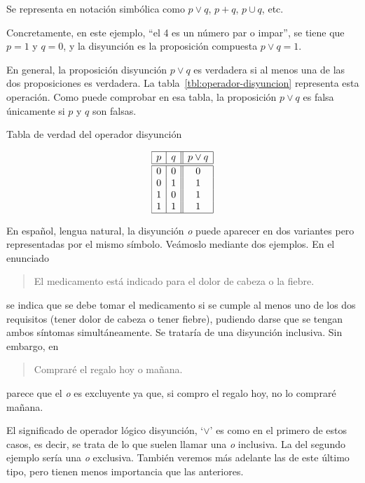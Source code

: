 \noindent Se representa en notación simbólica como $p \lor q$, $p + q$, $p
\cup q$, etc.

Concretamente, en este ejemplo, ``el 4 es un número par o impar'', se tiene
que $p = 1$ y $q = 0$, y la disyunción es la proposición compuesta $p \lor q
= 1$.

En general, la proposición disyunción $p \lor q$ es verdadera si al menos
una de las dos proposiciones es verdadera. La
tabla~\ref{tbl:operador-disyuncion} representa esta operación. Como puede
comprobar en esa tabla, la proposición $p \lor q$ es falsa únicamente si $p$
y $q$ son falsas.

\begin{table}[h]%
  \caption{Tabla de verdad del operador disyunción}
  \label{tbl:operador-disyuncion}%
  \centering
  $$
    \begin{array}{|c|c||c|}
      \hline
      p & q & p \lor q \\
      \hline
      \hline
      0 & 0 & 0 \\
      0 & 1 & 1 \\
      1 & 0 & 1 \\
      1 & 1 & 1 \\
      \hline
    \end{array}
  $$
\end{table}

En español, lengua natural, la disyunción \emph{o} puede aparecer en dos
variantes pero representadas por el mismo símbolo. Veámoslo mediante dos
ejemplos. En el enunciado

\begin{quote}
  El medicamento está indicado para el dolor de cabeza o la fiebre.
\end{quote}

\noindent se indica que se debe tomar el medicamento si se cumple al menos
uno de los dos requisitos (tener dolor de cabeza o tener fiebre), pudiendo
darse que se tengan ambos síntomas simultáneamente. Se trataría de una
disyunción inclusiva. Sin embargo, en

\begin{quote}
  Compraré el regalo hoy o mañana.
\end{quote}

\noindent parece que el \emph{o} es excluyente ya que, si compro el regalo
hoy, no lo compraré mañana.

El significado de operador lógico disyunción, `$\lor$' es como en el primero
de estos casos, es decir, se trata de lo que suelen llamar una \emph{o}
inclusiva. La del segundo ejemplo sería una \emph{o} exclusiva. También
veremos más adelante las de este último tipo, pero tienen menos importancia
que las anteriores.

